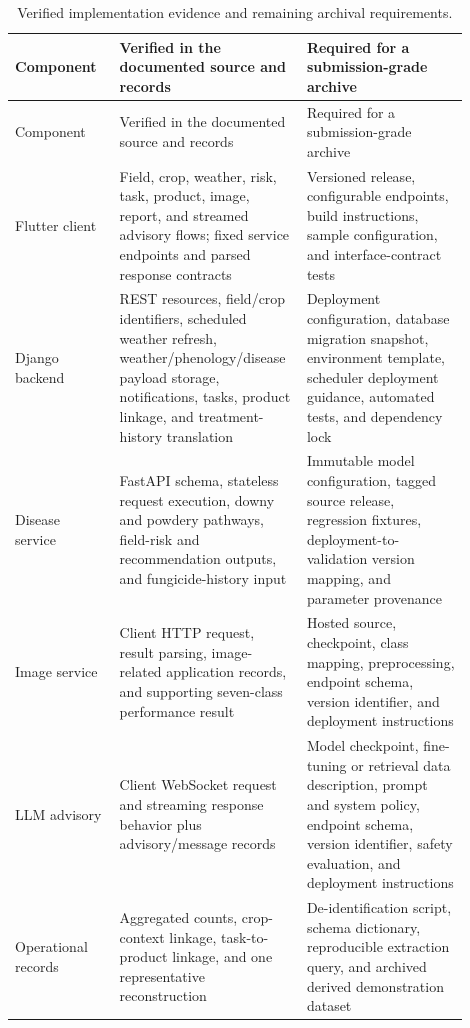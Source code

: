 \documentclass[12pt]{article}
\begin{document}
\begingroup
\setlength{\tabcolsep}{3pt}
\renewcommand{\arraystretch}{1.12}
\begin{longtable}{@{}L{0.22\linewidth} L{0.34\linewidth} L{0.34\linewidth}@{}}
\caption{Verified implementation evidence and remaining archival requirements.}\label{tab:supp_reproducibility_boundaries}\\
\toprule
Component & Verified in the documented source and records & Required for a submission-grade archive \\
\midrule
\endfirsthead
\toprule
Component & Verified in the documented source and records & Required for a submission-grade archive \\
\midrule
\endhead
Flutter client & Field, crop, weather, risk, task, product, image, report, and streamed advisory flows; fixed service endpoints and parsed response contracts & Versioned release, configurable endpoints, build instructions, sample configuration, and interface-contract tests \\
Django backend & REST resources, field/crop identifiers, scheduled weather refresh, weather/phenology/disease payload storage, notifications, tasks, product linkage, and treatment-history translation & Deployment configuration, database migration snapshot, environment template, scheduler deployment guidance, automated tests, and dependency lock \\
Disease service & FastAPI schema, stateless request execution, downy and powdery pathways, field-risk and recommendation outputs, and fungicide-history input & Immutable model configuration, tagged source release, regression fixtures, deployment-to-validation version mapping, and parameter provenance \\
Image service & Client HTTP request, result parsing, image-related application records, and supporting seven-class performance result & Hosted source, checkpoint, class mapping, preprocessing, endpoint schema, version identifier, and deployment instructions \\
LLM advisory & Client WebSocket request and streaming response behavior plus advisory/message records & Model checkpoint, fine-tuning or retrieval data description, prompt and system policy, endpoint schema, version identifier, safety evaluation, and deployment instructions \\
Operational records & Aggregated counts, crop-context linkage, task-to-product linkage, and one representative reconstruction & De-identification script, schema dictionary, reproducible extraction query, and archived derived demonstration dataset \\
\bottomrule
\end{longtable}
\endgroup
\end{document}
